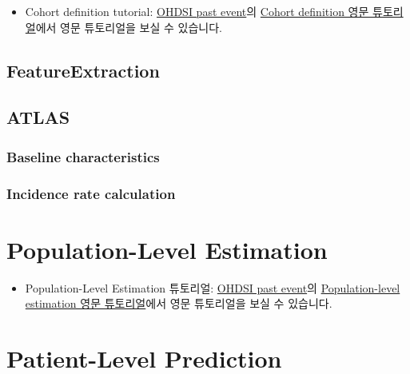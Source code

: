 \documentclass[]{book}
\providecommand{\tightlist}{%
  \setlength{\itemsep}{0pt}\setlength{\parskip}{0pt}}
\begin{document}
\begin{itemize}
\tightlist
\item
  Cohort definition tutorial: \href{https://www.ohdsi.org/past-events/}{OHDSI past event}의 \href{https://www.ohdsi.org/past-events/cohort-definitionphenotyping-tutorial/}{Cohort definition 영문 튜토리얼}에서 영문 튜토리얼을 보실 수 있습니다.
\end{itemize}

\hypertarget{featureextraction}{%
\section{FeatureExtraction}\label{featureextraction}}

\hypertarget{atlas-1}{%
\section{ATLAS}\label{atlas-1}}

\hypertarget{baseline-characteristics}{%
\subsection{Baseline characteristics}\label{baseline-characteristics}}

\hypertarget{incidence-rate-calculation}{%
\subsection{Incidence rate calculation}\label{incidence-rate-calculation}}

\hypertarget{population-level-estimation}{%
\chapter{Population-Level Estimation}\label{population-level-estimation}}

\begin{itemize}
\tightlist
\item
  Population-Level Estimation 튜토리얼: \href{https://www.ohdsi.org/past-events/}{OHDSI past event}의 \href{https://www.ohdsi.org/past-events/population-level-estimation}{Population-level estimation 영문 튜토리얼}에서 영문 튜토리얼을 보실 수 있습니다.
\end{itemize}

\hypertarget{patient-level-prediction}{%
\chapter{Patient-Level Prediction}\label{patient-level-prediction}}
\end{document}
